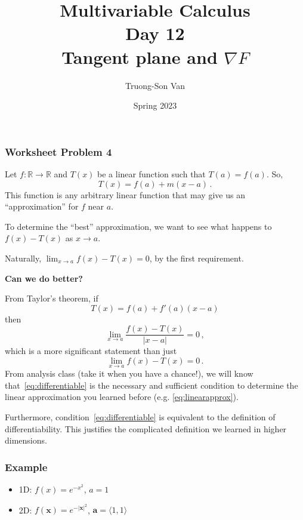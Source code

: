 \documentclass[aspectratio=169]{beamer}
\title{ Multivariable Calculus \\ Day 12\\ Tangent plane and $\nabla F$}
\institute{Fulbright University Vietnam}
\author{Truong-Son Van}
\date{Spring 2023}
\newcommand{\vect}{\mathbf}
\newcommand{\R}{\mathbb{R}}
\begin{document}
\maketitle

\begin{frame}
    \frametitle{ Worksheet Problem 4 }
    Let $f: \R \to \R$
    and $T(x)$ be a linear function such that $T(a) = f(a)$.
    So, 
    \begin{equation*}
        T(x) = f(a) + m(x-a) \,.
    \end{equation*}
    This function is any arbitrary linear function that may give us an ``approximation''
    for $f$ near $a$. \pause

    To determine the ``best'' approximation, we want to see what happens to
    $f(x) - T(x)$ as $x\to a$. \pause

    Naturally, $\lim_{x\to a} f(x) - T(x) = 0$, by the first requirement. \pause

    \textbf{Can we do better?}
\end{frame}

\begin{frame}
    From Taylor's theorem,
    if 
    \begin{equation}
        T(x) = f(a) + f'(a) (x-a) \label{eq:linearapprox}
    \end{equation}
    then \pause
    \begin{equation}
        \lim_{x\to a} \frac{f(x) - T(x)}{|x-a|} = 0 \,, \label{eq:differentiable}
    \end{equation}
    which is a more significant statement than just
    \begin{equation*}
        \lim_{x\to a} f(x) - T(x) = 0 \,.
    \end{equation*}
    \pause
    From analysis class (take it when you have a chance!), 
   we will know that~\eqref{eq:differentiable} is the
    necessary and sufficient condition to 
    determine the linear approximation you learned before (e.g. \eqref{eq:linearapprox}).

    \pause
    Furthermore, condition~\eqref{eq:differentiable} is equivalent to the definition
    of differentiability.
    This justifies the complicated definition we learned in higher dimensions.
\end{frame}

\begin{frame}
    \frametitle{Example}
    \begin{itemize}
        \item 1D: $f(x) = e^{-x^2}$, $a =1$
        \item 2D: $f(\vect{x}) = e^{-|\vect{x}|^2}$, $\vect{a} = \langle 1,1 \rangle$
    \end{itemize}
\end{frame}
\end{document}
